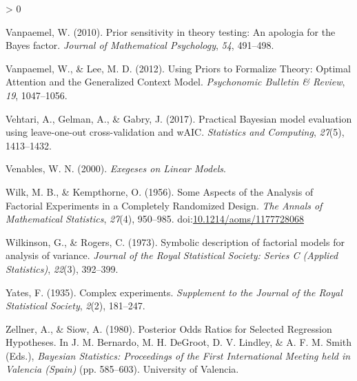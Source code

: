 \documentclass[
  english,
  ,man]{apa6}
\newlength{\cslhangindent}
\newenvironment{CSLReferences}[2] %
 {%
  \setlength{\parindent}{0pt}
  \ifodd #1 \everypar{\setlength{\hangindent}{\cslhangindent}}\ignorespaces\fi
  \ifnum #2 > 0
  \setlength{\parskip}{#2\baselineskip}
  \fi
 }%
 {}
\begin{document}
\begin{CSLReferences}{1}{0}
\leavevmode\hypertarget{ref-Vanpaemel.2010}{}%
Vanpaemel, W. (2010). Prior sensitivity in theory testing: {An} apologia for the {Bayes} factor. \emph{Journal of Mathematical Psychology}, \emph{54}, 491--498.

\leavevmode\hypertarget{ref-Vanpaemel.Lee.2012}{}%
Vanpaemel, W., \& Lee, M. D. (2012). Using {Priors} to {Formalize Theory}: {Optimal Attention} and the {Generalized Context Model}. \emph{Psychonomic Bulletin \& Review}, \emph{19}, 1047--1056.

\leavevmode\hypertarget{ref-Vehtari.etal.2017}{}%
Vehtari, A., Gelman, A., \& Gabry, J. (2017). Practical {Bayesian} model evaluation using leave-one-out cross-validation and {wAIC}. \emph{Statistics and Computing}, \emph{27}(5), 1413--1432.

\leavevmode\hypertarget{ref-Venables.2000}{}%
Venables, W. N. (2000). \emph{Exegeses on {Linear Models}}.

\leavevmode\hypertarget{ref-Wilk.Kempthorne.1956}{}%
Wilk, M. B., \& Kempthorne, O. (1956). Some {Aspects} of the {Analysis} of {Factorial Experiments} in a {Completely Randomized Design}. \emph{The Annals of Mathematical Statistics}, \emph{27}(4), 950--985. doi:\href{https://doi.org/10.1214/aoms/1177728068}{10.1214/aoms/1177728068}

\leavevmode\hypertarget{ref-Wilkinson.Rogers.1973}{}%
Wilkinson, G., \& Rogers, C. (1973). Symbolic description of factorial models for analysis of variance. \emph{Journal of the Royal Statistical Society: Series C (Applied Statistics)}, \emph{22}(3), 392--399.

\leavevmode\hypertarget{ref-Yates.1935}{}%
Yates, F. (1935). Complex experiments. \emph{Supplement to the Journal of the Royal Statistical Society}, \emph{2}(2), 181--247.

\leavevmode\hypertarget{ref-Zellner.Siow.1980}{}%
Zellner, A., \& Siow, A. (1980). Posterior {Odds Ratios} for {Selected Regression Hypotheses}. In J. M. Bernardo, M. H. DeGroot, D. V. Lindley, \& A. F. M. Smith (Eds.), \emph{Bayesian {Statistics}: {Proceedings} of the {First International Meeting} held in {Valencia} ({Spain})} (pp. 585--603). {University of Valencia}.

\end{CSLReferences}
\end{document}
